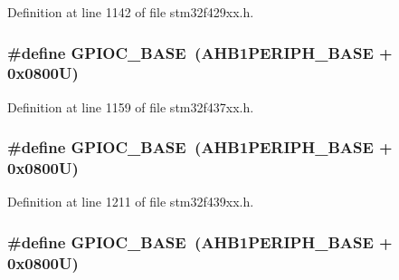 Definition at line 1142 of file stm32f429xx.\+h.

\subsubsection[{\texorpdfstring{G\+P\+I\+O\+C\+\_\+\+B\+A\+SE}{GPIOC_BASE}}]{\setlength{\rightskip}{0pt plus 5cm}\#define G\+P\+I\+O\+C\+\_\+\+B\+A\+SE~({\bf A\+H\+B1\+P\+E\+R\+I\+P\+H\+\_\+\+B\+A\+SE} + 0x0800\+U)}\hypertarget{group___peripheral__memory__map_ga26f267dc35338eef219544c51f1e6b3f}{}\label{group___peripheral__memory__map_ga26f267dc35338eef219544c51f1e6b3f}


Definition at line 1159 of file stm32f437xx.\+h.

\subsubsection[{\texorpdfstring{G\+P\+I\+O\+C\+\_\+\+B\+A\+SE}{GPIOC_BASE}}]{\setlength{\rightskip}{0pt plus 5cm}\#define G\+P\+I\+O\+C\+\_\+\+B\+A\+SE~({\bf A\+H\+B1\+P\+E\+R\+I\+P\+H\+\_\+\+B\+A\+SE} + 0x0800\+U)}\hypertarget{group___peripheral__memory__map_ga26f267dc35338eef219544c51f1e6b3f}{}\label{group___peripheral__memory__map_ga26f267dc35338eef219544c51f1e6b3f}


Definition at line 1211 of file stm32f439xx.\+h.

\subsubsection[{\texorpdfstring{G\+P\+I\+O\+C\+\_\+\+B\+A\+SE}{GPIOC_BASE}}]{\setlength{\rightskip}{0pt plus 5cm}\#define G\+P\+I\+O\+C\+\_\+\+B\+A\+SE~({\bf A\+H\+B1\+P\+E\+R\+I\+P\+H\+\_\+\+B\+A\+SE} + 0x0800\+U)}\hypertarget{group___peripheral__memory__map_ga26f267dc35338eef219544c51f1e6b3f}{}\label{group___peripheral__memory__map_ga26f267dc35338eef219544c51f1e6b3f}


